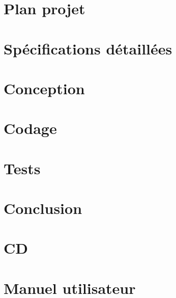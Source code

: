 \documentclass[12pt,a4paper,titlepage,openright]{report}
\begin{document}
    \renewcommand{\contentsname}{Sommaire}
    \tableofcontents


    \normalsize
    \part{ Plan projet}
    \part{ Spécifications détaillées}
    \part{ Conception}
    \part{ Codage}
    \part{ Tests}
    
    \part{ Conclusion}


    \appendix
    \part{CD}
    \part{Manuel utilisateur}
\end{document}
